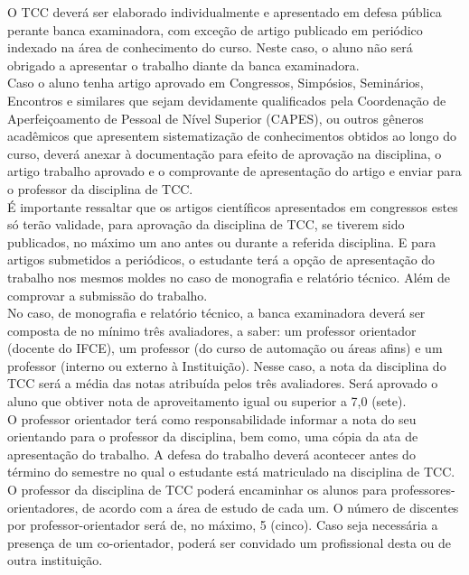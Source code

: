 O TCC deverá ser elaborado individualmente e apresentado em defesa pública perante banca examinadora, com exceção de artigo publicado em periódico indexado na área de conhecimento do curso. Neste caso, o aluno não será obrigado a apresentar o trabalho diante da banca examinadora.\\

Caso o aluno tenha artigo aprovado em Congressos, Simpósios, Seminários, Encontros e similares que sejam devidamente qualificados pela Coordenação de Aperfeiçoamento de Pessoal de Nível Superior (CAPES), ou outros gêneros acadêmicos que apresentem sistematização de conhecimentos obtidos ao longo do curso, deverá anexar à documentação para efeito de aprovação na disciplina, o artigo trabalho aprovado e o comprovante de apresentação do artigo e enviar para o professor da disciplina de TCC.\\

É importante ressaltar que os artigos científicos apresentados em congressos estes só terão validade, para aprovação da disciplina de TCC, se tiverem sido publicados, no máximo um ano antes ou durante a referida disciplina. E para artigos submetidos a periódicos, o estudante terá a opção de apresentação do trabalho nos mesmos moldes no caso de monografia e relatório técnico. Além de comprovar a submissão do trabalho.\\

No caso, de monografia e relatório técnico, a banca examinadora deverá ser composta de no mínimo três avaliadores, a saber: um professor orientador (docente do IFCE), um professor (do curso de automação ou áreas afins) e um professor (interno ou externo à Instituição). Nesse caso, a nota da disciplina do TCC será a média das notas atribuída pelos três avaliadores. Será aprovado o aluno que obtiver nota de aproveitamento igual ou superior a 7,0 (sete).\\

O professor orientador terá como responsabilidade informar a nota do seu orientando para o professor da disciplina, bem como, uma cópia da ata de apresentação do trabalho. A defesa do trabalho deverá acontecer antes do término do semestre no qual o estudante está matriculado na disciplina de TCC.\\

O professor da disciplina de TCC poderá encaminhar os alunos para professores-orientadores, de acordo com a área de estudo de cada um. O número de discentes por professor-orientador será de, no máximo, 5 (cinco). Caso seja necessária a presença de um co-orientador, poderá ser convidado um profissional desta ou de outra instituição.\\


